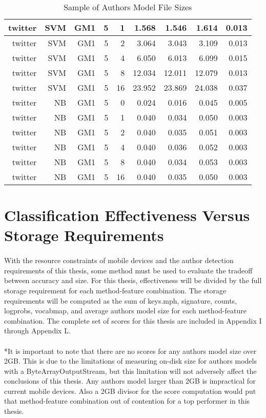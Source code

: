 \begin{table}[htbp!]
\begin{center}
\begin{tabular}{ | r | r | r | r | r | r | r | r | r | }
		twitter & SVM & GM1 & 5 & 1 & 1.568 & 1.546 & 1.614 & 0.013\\ \hline 
		twitter & SVM & GM1 & 5 & 2 & 3.064 & 3.043 & 3.109 & 0.013\\ \hline 
		twitter & SVM & GM1 & 5 & 4 & 6.050 & 6.013 & 6.099 & 0.015\\ \hline 
		twitter & SVM & GM1 & 5 & 8 & 12.034 & 12.011 & 12.079 & 0.013\\ \hline 
		twitter & SVM & GM1 & 5 & 16 & 23.952 & 23.869 & 24.038 & 0.037\\ \hline 
		twitter & NB & GM1 & 5 & 0 & 0.024 & 0.016 & 0.045 & 0.005\\ \hline 
		twitter & NB & GM1 & 5 & 1 & 0.040 & 0.034 & 0.050 & 0.003\\ \hline 
		twitter & NB & GM1 & 5 & 2 & 0.040 & 0.035 & 0.051 & 0.003\\ \hline 
		twitter & NB & GM1 & 5 & 4 & 0.040 & 0.036 & 0.052 & 0.003\\ \hline 
		twitter & NB & GM1 & 5 & 8 & 0.040 & 0.034 & 0.053 & 0.003\\ \hline 
		twitter & NB & GM1 & 5 & 16 & 0.040 & 0.035 & 0.050 & 0.003\\ \hline 
		\end{tabular}
		\caption{Sample of Authors Model File Sizes}
		\label{tab:sample_authors_model_sizes}
		\end{center}
	\end{table}

\section{Classification Effectiveness Versus Storage Requirements}
\paragraph*{} With the resource constraints of mobile devices and the author detection requirements of this thesis, some method must be used to evaluate the tradeoff between accuracy and size.  For this thesis, effectiveness will be divided by the full storage requirement for each method-feature combination.  The storage requirements will be computed as the sum of keys.mph, signature, counts, logprobs, vocabmap, and average authors model size for each method-feature combination.  The complete set of scores for this thesis are included in Appendix I through Appendix L.  

\paragraph{}*It is important to note that there are no scores for any authors model size over 2GB.  This is due to the limitations of measuring on-disk size for authors models with a ByteArrayOutputStream, but this limitation will not adversely affect the conclusions of this thesis.  Any authors model larger than 2GB is impractical for current mobile devices.  Also a 2GB divisor for the score computation would put that method-feature combination out of contention for a top performer in this thesis.

